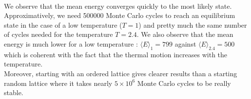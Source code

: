 \documentclass[a4paper, twoside, 11pt]{report}
\theoremstyle{theorem}
\theoremstyle{remark}
\theoremstyle{exemple}
\begin{document}
                \paragraph{}We observe that the mean energy converges quickly to the most likely state. Approximatively, we need 500000 Monte Carlo cycles to reach an equilibrium state in the case of a low temperature ($T=1$) and pretty much the same number of cycles needed for the temperature $T=2.4$. We also observe that the mean energy is much lower for a low temperature : $\langle E \rangle_1 = 799$ against $\langle E \rangle_{2.4}=500$ which is coherent with the fact that the thermal motion increases with the temperature.\\
                Moreover, starting with an ordered lattice gives clearer results than a starting random lattice where it takes nearly $5 \times 10^6$ Monte Carlo cycles to be really stable. 
                
\end{document}
